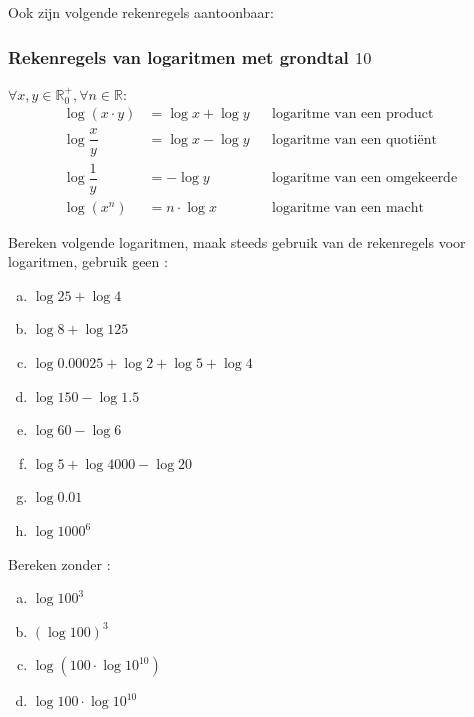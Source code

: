 \documentclass[12pt,twoside,a4paper]{article}
\begin{document}
Ook zijn volgende rekenregels aantoonbaar:

\subsubsection*{Rekenregels van logaritmen met grondtal $10$}
\begin{mdframed}
$\forall x,y \in \mathbb{R}_0^+, \forall n\in \mathbb{R}:$
\begin{align*}
\log(x\cdot y) &= \log x + \log y && \mbox{logaritme van een product}\\
\log \dfrac{x}{y} &= \log x - \log y && \mbox{logaritme van een quotiënt}\\
\log \dfrac{1}{y} &= - \log y && \mbox{logaritme van een omgekeerde}\\
\log(x^n) &= n\cdot\log x && \mbox{logaritme van een macht}
\end{align*}
\end{mdframed}

\begin{oefening}
Bereken volgende logaritmen, maak steeds gebruik van de rekenregels voor logaritmen, gebruik geen :
\begin{multicols}{2}
  \begin{enumerate}[(a)]
    \itemsep1em
  \item $\log 25 + \log 4$
  \item $\log 8 + \log 125$
  \item $\log 0.00025 + \log 2 + \log 5 +\log 4$
  \item $\log 150 - \log 1.5$
  \item $\log 60 - \log 6$
  \item $\log 5 + \log 4000 - \log 20 $
  \item $\log 0.01$
  \item $\log 1000^6$
  \end{enumerate}
\end{multicols}
\end{oefening}

\begin{oefening}
Bereken zonder :
\begin{multicols}{2}
\begin{enumerate}[(a)]
  \item $\displaystyle\log 100^3$
  \item $\displaystyle\left(\log 100\right)^3$
  \item $\displaystyle\log \left( 100 \cdot \log 10^{10} \right)$
  \item $\displaystyle\log 100 \cdot \log 10^{10}$
\end{enumerate}
\end{multicols}
\end{oefening}
\end{document}
